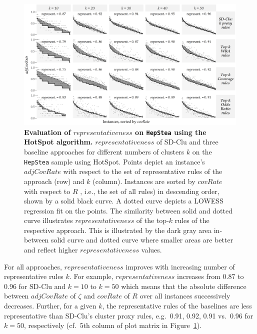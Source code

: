 \documentclass[
  oneside]{book}
\begin{document}
\begin{figure}

{\centering \includegraphics[width=1\linewidth]{figures/04-representativeness-hepStea-hotSpot} 

}

\caption{\textbf{Evaluation of \(representativeness\) on \texttt{HepStea} using the HotSpot algorithm.} \(representativeness\) of SD-Clu and three baseline approaches for different numbers of clusters \(k\) on the \texttt{HepStea} sample using HotSpot. Points depict an instance's \(adjCovRate\) with respect to the set of representative rules of the approach (row) and \(k\) (column). Instances are sorted by \(covRate\) with respect to \(R\) , i.e., the set of all rules) in descending order, shown by a solid black curve. A dotted curve depicts a LOWESS regression fit on the points. The similarity between solid and dotted curve illustrates \(representativeness\) of the top-\(k\) rules of the respective approach. This is illustrated by the dark gray area in-between solid curve and dotted curve where smaller areas are better and reflect higher \(representativeness\) values.}\label{fig:04-representativeness-hepStea-hotSpot}
\end{figure}

For all approaches, \(representativeness\) improves with increasing number of representative rules \(k\).
For example, \(representativeness\) increases from 0.87 to 0.96 for SD-Clu and \(k=10\) to \(k=50\) which means that the absolute difference between \(adjCovRate\) of \(\zeta\) and \(covRate\) of \(R\) over all instances successively decreases.
Further, for a given \(k\), the representative rules of the baselines are less representative than SD-Clu's cluster proxy rules, e.g.~0.91, 0.92, 0.91 vs.~0.96 for \(k=50\), respectively (cf.~5th column of plot matrix in Figure~\ref{fig:04-representativeness-hepStea-hotSpot}).
\end{document}
